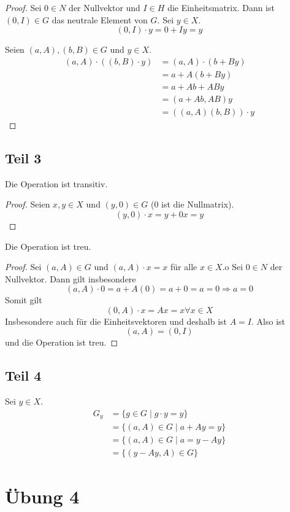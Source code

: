 \documentclass[10pt,a4paper]{article}
\begin{document}
\begin{proof}
  Sei $0 \in N$ der Nullvektor und $I \in H$ die Einheitsmatrix.
  Dann ist $(0, I) \in G$ das neutrale Element von $G$.
  Sei $y \in X$.
  \begin{equation}
    (0, I) \cdot y = 0 + Iy = y
  \end{equation}

  Seien $(a, A), (b, B) \in G$ und $y \in X$.
  \begin{align*}
    (a, A) \cdot ((b, B) \cdot y) & = (a, A) \cdot (b + By)\\
    & = a + A(b + By)\\
    & = a + Ab + ABy\\
    & = (a + Ab, AB)y\\
    & = ((a, A)(b, B)) \cdot y
  \end{align*}
\end{proof}

\subsection{Teil 3}

Die Operation ist transitiv.
\begin{proof}
  Seien $x, y \in X$ und $(y, 0) \in G$ ($0$ ist die Nullmatrix).
  \begin{equation}
    (y, 0) \cdot x = y + 0x = y
  \end{equation}
\end{proof}

Die Operation ist treu.
\begin{proof}
  Sei $(a, A) \in G$ und $(a, A) \cdot x = x$ für alle $x \in X$.o
  Sei $0 \in N$ der Nullvektor.
  Dann gilt insbesondere
  \begin{equation}
    (a, A) \cdot 0 = a + A(0) = a + 0 = a = 0 \Rightarrow a = 0
  \end{equation}
  Somit gilt
  \begin{equation}
    (0, A) \cdot x = Ax = x \forall x \in X
  \end{equation}
  Insbesondere auch für die Einheitsvektoren und deshalb ist $A = I$.
  Also ist
  \begin{equation}
    (a, A) = (0, I)
  \end{equation}
  und die Operation ist treu.
\end{proof}

\subsection{Teil 4}

Sei $y \in X$.
\begin{align*}
  G_{y} & = \{ g \in G \mid g \cdot y = y \}\\
  & = \{ (a, A) \in G \mid a + Ay = y \}\\
  & = \{ (a, A) \in G \mid a = y - Ay \}\\
  & = \{ (y - Ay, A) \in G \}
\end{align*}

\section{Übung 4}
\end{document}
